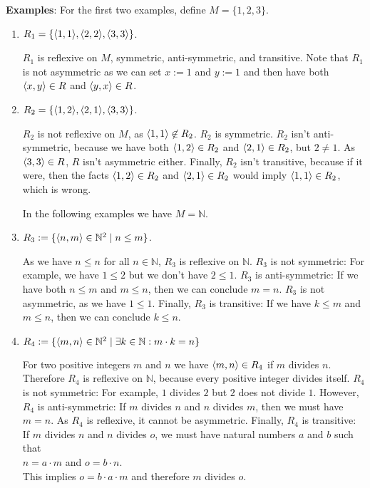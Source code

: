\noindent
\textbf{Examples}:  For the first two examples, define $M = \{1,2,3\}$.
\begin{enumerate}
\item $R_1 = \{ \pair(1,1), \pair(2,2), \pair(3,3) \}$.

      $R_1$ is reflexive on $M$, symmetric, anti-symmetric, and transitive.
      Note that $R_1$ is not asymmetric as we can set $x := 1$ and $y := 1$ 
      and then have both $\pair(x,y) \in R$ and $\pair(y,x) \in R$.
\item $R_2 = \{ \pair(1,2), \pair(2,1), \pair(3,3) \}$.

      $R_2$ is not  reflexive on $M$, as $\pair(1,1) \not\in R_2$.
      $R_2$ is symmetric. 
      $R_2$ isn't anti-symmetric, because we have both $\pair(1,2) \in R_2$ and 
      $\pair(2,1) \in R_2$, but $2 \not=1$.
      As $\pair(3, 3) \in R$, $R$ isn't asymmetric either.
      Finally,  $R_2$ isn't transitive, because if it were, then the facts
      $\pair(1,2) \in R_2$ and 
      $\pair(2,1) \in R_2$ would imply $\pair(1,1) \in R_2$, which is wrong.

      In the following examples we have $M = \mathbb{N}$.
\item $R_3 := \{ \pair(n,m) \in \mathbb{N}^2 \mid n \leq m \}$.

      As we have $n \leq n$ for all $n \in \mathbb{N}$, $R_3$ is reflexive on $\mathbb{N}$.  
      $R_3$ is not symmetric: For example, we have $1 \leq 2$ but we don't have $2 \leq
      1$.  
      $R_3$ is  anti-symmetric: If we have both $n \leq m$ and $m \leq n$, then we can
      conclude $m = n$.
      $R_3$ is not asymmetric, as we have $1 \leq 1$.
      Finally, $R_3$ is transitive: If we have $k \leq m$ and $m \leq n$, then we can conclude
      $k \leq n$.
\item $R_4 := \{ \pair(m,n) \in \mathbb{N}^2 \mid \exists k\in \mathbb{N}: m\cdot k = n \}$

      For two positive integers $m$ and $n$ we have $\pair(m,n) \in R_4$ if $m$ divides
      $n$.  Therefore $R_4$ is reflexive on $\mathbb{N}$, because every positive 
      integer divides itself.  $R_4$ is not  symmetric: For example, $1$ divides  $2$ 
      but $2$ does not divide $1$.  However, $R_4$ is anti-symmetric: If 
      $m$ divides $n$  and $n$ divides $m$, then we must have $m = n$.  
      As $R_4$ is reflexive, it cannot be asymmetric.
      Finally,  $R_4$ is transitive: If  $m$ divides $n$ and
      $n$ divides  $o$,  we must have natural numbers  $a$ and $b$ such that
      \\[0.2cm]
      \hspace*{1.3cm}
      $n = a \cdot m$ \quad and \quad $o = b \cdot n$.
      \\[0.2cm]
      This implies $o = b \cdot a \cdot m$ and therefore $m$ divides $o$.
\end{enumerate}

